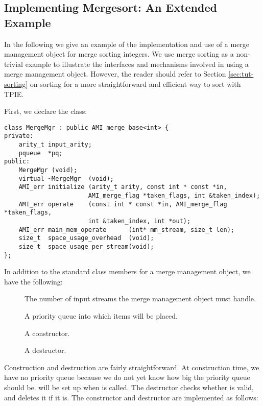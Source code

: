 \subsection{Implementing Mergesort: An Extended Example}

In the following we give an example of the implementation and
use of a merge management object for merge sorting integers.
We use merge sorting as a non-trivial example to illustrate
the interfaces and mechanisms involved in using a merge
management object. However, the reader should refer to
Section \ref{sec:tut-sorting} on sorting for a more
straightforward and efficient way to sort with TPIE.

First, we declare the class:


\begin{verbatim}
class MergeMgr : public AMI_merge_base<int> { 
private:
    arity_t input_arity;
    pqueue  *pq;
public:
    MergeMgr (void);
    virtual ~MergeMgr  (void);
    AMI_err initialize (arity_t arity, const int * const *in,
                       AMI_merge_flag *taken_flags, int &taken_index);
    AMI_err operate    (const int * const *in, AMI_merge_flag *taken_flags,
                       int &taken_index, int *out);
    AMI_err main_mem_operate      (int* mm_stream, size_t len);
    size_t  space_usage_overhead  (void);
    size_t  space_usage_per_stream(void);
};
\end{verbatim}

In addition to the standard class members for a merge management
object, we have the following:

\begin{description}
    \item[] The number of input streams
    the merge management object must handle.
    \item[] A priority queue into which items
    will be placed.
    \item[] A constructor.
    \item[] A destructor.
\end{description}

Construction and destruction are fairly straightforward.  At construction
time, we have no priority queue because we do not yet know how big the
priority queue should be.   will be set up when 
is called.  The destructor checks whether
 is valid, and deletes it if it is.  The constructor and
destructor are implemented as follows:

